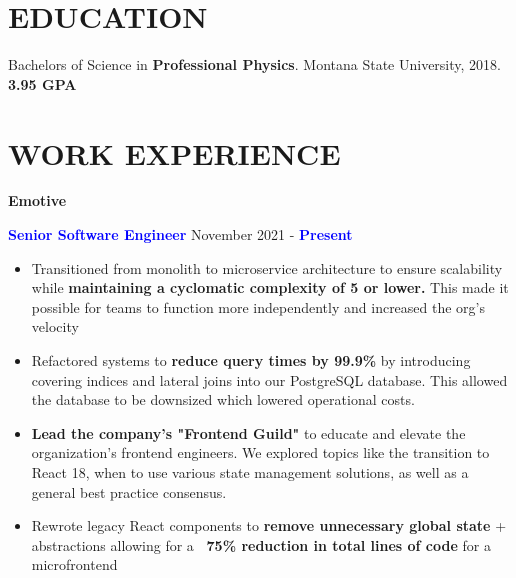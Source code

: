 \documentclass[11pt]{resume}
\begin{document}
    \vspace{-1em}
    \noindent\begin{minipage}[t]{1\textwidth}
      {\section* {\large{EDUCATION}}}
      Bachelors of Science in {\bf Professional Physics}. Montana State University,
      2018.
      {\bf 3.95 GPA}

      {\section* {\large{WORK EXPERIENCE}}}
      {\bf Emotive}
      \vspace{.25em}
      \begin{addmargin}[.5em]{0em}
        {\bf \textcolor{blue}{Senior Software Engineer}} {\hfill November 2021 - {\bf \textcolor{blue}{Present}}}
        \vspace{-.5em}
        \begin{itemize}
            \setlength\itemsep{-.2em}

            \item {Transitioned from monolith to microservice architecture to
              ensure scalability while {\bf maintaining a cyclomatic complexity
              of 5 or lower.} This made it possible for teams to function more independently
              and increased the org's velocity}
            \item {Refactored systems to {\bf reduce query times by
              99.9\%} by introducing covering indices and lateral joins into
              our PostgreSQL database. This allowed the database to be downsized which
              lowered operational costs.}
            \item {{\bf Lead the company's "Frontend Guild"} to educate and
              elevate the organization's frontend engineers. We explored topics
              like the transition to React 18, when to use various state
              management solutions, as well as a general best practice consensus.}
            \item {Rewrote legacy React components to {\bf remove unnecessary global
              state} + abstractions allowing for a {\bf ~75\% reduction in total
              lines of code} for a microfrontend}


\end{itemize}
\end{addmargin}
\end{minipage}
\end{document}
